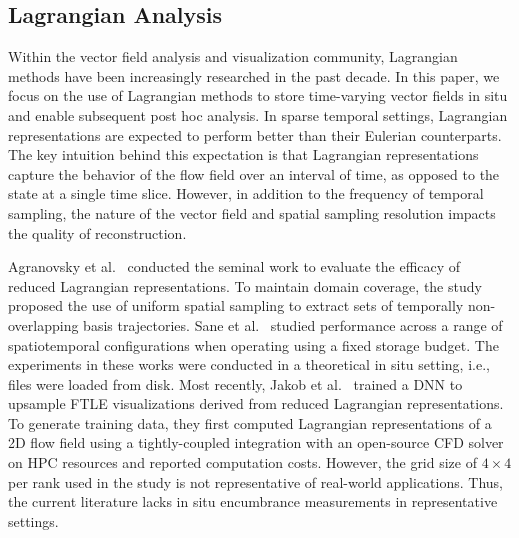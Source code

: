 \setlength{\belowdisplayskip}{3pt} \setlength{\belowdisplayshortskip}{3pt}
\setlength{\abovedisplayskip}{3pt} \setlength{\abovedisplayshortskip}{3pt}


\renewcommand{\baselinestretch}{1}
\vspace{-1mm}
\subsection{Lagrangian Analysis}
Within the vector field analysis and visualization community, Lagrangian methods have been increasingly researched in the past decade. 
%
In this paper, we focus on the use of Lagrangian methods to store time-varying vector fields in situ and enable subsequent post hoc analysis.
%
%
In sparse temporal settings, Lagrangian representations are expected to perform better than their Eulerian counterparts. 
%
The key intuition behind this expectation is that Lagrangian representations capture the behavior of the flow field over an interval of time, as opposed to the state at a single time slice.
%
However, in addition to the frequency of temporal sampling, the nature of the vector field and spatial sampling resolution impacts the quality of reconstruction.
%

Agranovsky et al.~\cite{agranovsky2014improved} conducted the seminal work to evaluate the efficacy of reduced Lagrangian representations.
%
To maintain domain coverage, the study proposed the use of uniform spatial sampling to extract sets of temporally non-overlapping basis trajectories.
%
Sane et al.~\cite{sane2018revisiting} studied performance across a range of spatiotemporal configurations when operating using a fixed storage budget.
%
The experiments in these works were conducted in a theoretical in situ setting, i.e., files were loaded from disk. %
%
Most recently, Jakob et al.~\cite{Jakob20} trained a DNN to upsample FTLE visualizations derived from reduced Lagrangian representations. 
%
To generate training data, they first computed Lagrangian representations of a 2D flow field using a tightly-coupled integration with an open-source CFD solver on HPC resources and reported computation costs.
%
However, the grid size of $4\times4$ per rank used in the study is not representative of real-world applications.
%
Thus, the current literature lacks in situ encumbrance measurements in representative settings.
%

